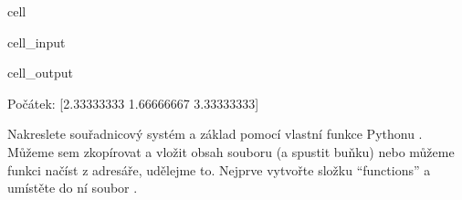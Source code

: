 \documentclass[letterpaper,10pt,english]{jupyterBook}
\begin{document}
\begin{sphinxuseclass}{cell}\begin{sphinxVerbatimInput}

\begin{sphinxuseclass}{cell_input}
\begin{sphinxVerbatim}[commandchars=\\\{\}]
     
 
\end{sphinxVerbatim}

\end{sphinxuseclass}\end{sphinxVerbatimInput}
\begin{sphinxVerbatimOutput}

\begin{sphinxuseclass}{cell_output}
\begin{sphinxVerbatim}[commandchars=\\\{\}]
Počátek:  [2.33333333 1.66666667 3.33333333]
\end{sphinxVerbatim}

\end{sphinxuseclass}\end{sphinxVerbatimOutput}

\end{sphinxuseclass}
\sphinxAtStartPar
Nakreslete souřadnicový systém a základ pomocí vlastní funkce Pythonu .
Můžeme sem zkopírovat a vložit obsah souboru  (a spustit buňku) nebo můžeme funkci načíst z adresáře, udělejme to. Nejprve vytvořte složku “functions” a umístěte do ní soubor .
\end{document}
